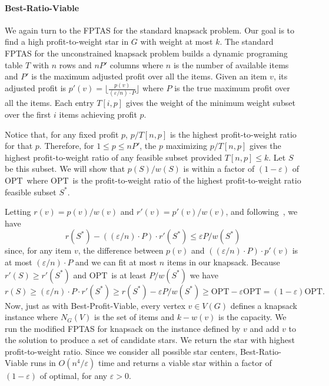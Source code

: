 \documentclass[12pt]{article}
\newcommand{\OPT}{\ensuremath{\mathrm{OPT}\xspace}}
\begin{document}
\paragraph{{\sc Best-Ratio-Viable}}

We again turn to the FPTAS for the standard knapsack problem.  Our goal is to find a high profit-to-weight star in $G$ with weight at most $k$.  The standard FPTAS for the unconstrained knapsack problem builds a dynamic programing table $T$  with $n$ rows and $nP'$ columns where $n$ is the number of available items and $P'$ is the maximum adjusted profit over all the items.  Given an item $v$, its adjusted profit is $p'(v) = \lfloor \frac{p(v)}{ (\varepsilon / n) \cdot P} \rfloor$ where $P$ is the true maximum profit over all the items.  Each entry $T[i,p]$ gives the weight of the minimum weight subset over the first $i$ items achieving profit $p$.

Notice that, for any fixed profit $p$, $p / T[n,p]$ is the highest profit-to-weight ratio for that $p$.  Therefore, for $1 \leq p \leq nP'$, the $p$ maximizing $p / T[n,p]$ gives the highest profit-to-weight ratio of any feasible subset provided $T[n,p] \leq k$.  Let $S$ be this subset.  We will show that $p(S) / w(S)$ is within a factor of $(1-\varepsilon)$ of \OPT\ where \OPT\ is the profit-to-weight ratio of the highest profit-to-weight ratio feasible subset $S^{*}$.

Letting $r(v) = p(v) / w(v)$ and $r'(v) = p'(v) / w(v)$, and following~\cite{vazirani}, we have
\[
r(S^{*}) - ((\varepsilon / n) \cdot P)  \cdot  r'(S^{*}) \leq \varepsilon P / w(S^{*})
\]
since, for any item $v$, the difference between $p(v)$ and $((\varepsilon / n) \cdot P) \cdot p'(v)$ is at most $(\varepsilon / n) \cdot P$ and we can fit at most $n$ items in our knapsack.  Because $r'(S) \geq r'(S^{*})$ and \OPT \ is at least $P / w(S^{*})$ we have
\[
r(S)  \geq  (\varepsilon / n) \cdot P \cdot r'(S^{*}) \geq  r(S^{*}) - \varepsilon P / w(S^{*}) \geq   \OPT - \varepsilon \OPT = (1-\varepsilon)\OPT.
\]
Now, just as with {\sc Best-Profit-Viable}, every vertex $v \in V(G)$ defines a knapsack instance where $N_{G}(V)$ is the set of items and $k-w(v)$ is the capacity.  We run the modified FPTAS for knapsack on the instance defined by $v$ and add $v$ to the solution to produce a set of candidate stars.  We return the star with highest profit-to-weight ratio.  Since we consider all possible star centers, {\sc Best-Ratio-Viable} runs in $O(n^{4} / \varepsilon)$ time and returns a viable star within a factor of $(1-\varepsilon)$ of optimal, for any $\varepsilon > 0$.
\end{document}
